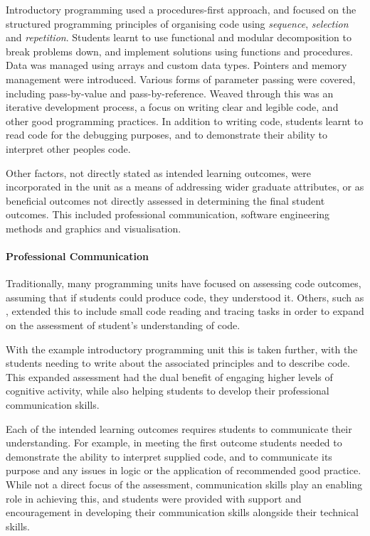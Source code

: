 Introductory programming used a procedures-first approach, and focused on the structured programming principles of organising code using \emph{sequence}, \emph{selection} and \emph{repetition}. Students learnt to use functional and modular decomposition to break problems down, and implement solutions using functions and procedures. Data was managed using arrays and custom data types. Pointers and memory management were introduced. Various forms of parameter passing were covered, including pass-by-value and pass-by-reference. Weaved through this was an iterative development process, a focus on writing clear and legible code, and other good programming practices. In addition to writing code, students learnt to read code for the debugging purposes, and to demonstrate their ability to interpret other peoples code.

Other factors, not directly stated as intended learning outcomes, were incorporated in the unit as a means of addressing wider graduate attributes, or as beneficial outcomes not directly assessed in determining the final student outcomes. This included professional communication, software engineering methods and graphics and visualisation.

\paragraph{Professional Communication} %
\label{par:professional_communication}

Traditionally, many programming units have focused on assessing code outcomes, assuming that if students could produce code, they understood it. Others, such as \citet{Lister:2004}, extended this to include small code reading and tracing tasks in order to expand on the assessment of student's understanding of code. 

With the example introductory programming unit this is taken further, with the students needing to write about the associated principles and to describe code. This expanded assessment had the dual benefit of engaging higher levels of cognitive activity, while also helping students to develop their professional communication skills.

Each of the intended learning outcomes requires students to communicate their understanding. For example, in meeting the first outcome students needed to demonstrate the ability to interpret supplied code, and to communicate its purpose and any issues in logic or the application of recommended good practice. While not a direct focus of the assessment, communication skills play an enabling role in achieving this, and students were provided with support and encouragement in developing their communication skills alongside their technical skills.


